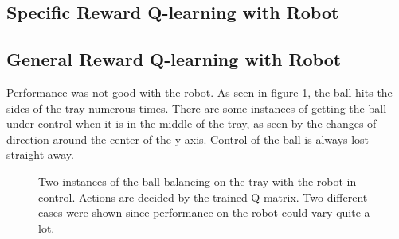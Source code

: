 \documentclass[12pt,a4paper]{article}
\begin{document}
\subsection{Specific Reward Q-learning with Robot}
\subsection{General Reward Q-learning with Robot}
Performance was not good with the robot. As seen in figure \ref{q_nao}, the ball hits the sides of the tray numerous times. There are some instances of getting the ball under control when it is in the middle of the tray, as seen by the changes of direction around the center of the y-axis. Control of the ball is always lost straight away.
\begin{figure}[H]
	\centering
	\caption{Two instances of the ball balancing on the tray with the robot in control. Actions are decided by the trained Q-matrix. Two different cases were shown since performance on the robot could vary quite a lot.}
	\label{q_nao}
\end{figure}
\end{document}
